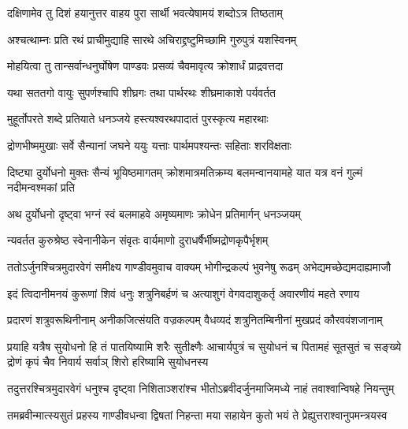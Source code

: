 \twolineshloka
{दक्षिणामेव तु दिशं हयानुत्तर वाहय}
{पुरा सार्थी भवत्येषामयं शब्दोऽत्र तिष्ठताम्}


\twolineshloka
{अश्चत्थाम्नः प्रति रथं प्राचीमुद्याहि सारथे}
{अचिराद्द्रष्टुमिच्छामि गुरुपुत्रं यशस्विनम्}



\twolineshloka
{मोहयित्वा तु तान्सर्वान्धनुर्घोषेण पाण्डवः}
{प्रसव्यं चैवमावृत्य क्रोशार्धं प्राद्रवत्तदा}


\twolineshloka
{यथा सततगो वायुः सुपर्णश्चापि शीघ्रगः}
{तथा पार्थरथः शीघ्रमाकाशे पर्यवर्तत}


\twolineshloka
{मुहूर्तोपरते शब्दे प्रतियाते धनञ्जये}
{हस्त्यश्वरथपादातं पुरस्कृत्य महारथाः}


\twolineshloka
{द्रोणभीष्ममुखाः सर्वे सैन्यानां जघने ययुः}
{यत्ताः पार्थमपश्यन्तः सहिताः शरविक्षताः}




\threelineshloka
{दिष्ट्या दुर्योधनो मुक्तः सैन्यं भूयिष्ठमागतम्}
{क्रोशमात्रमतिक्रम्य बलमन्वानयामहे}
{यात यत्र वनं गुल्मं नदीमन्वश्मकां प्रति}



\twolineshloka
{अथ दुर्योधनो दृष्ट्वा भग्नं स्वं बलमाहवे}
{अमृष्यमाणः क्रोधेन प्रतिमार्गन् धनञ्जयम्}


\twolineshloka
{न्यवर्तत कुरुश्रेष्ठ स्वेनानीकेन संवृतः}
{वार्यमाणो दुराधर्षैर्भीष्मद्रोणकृपैर्भृशम्}


\fourlineindentedshloka
{ततोऽर्जुनश्चित्रमुदारवेगं}
{समीक्ष्य गाण्डीवमुवाच वाक्यम्}
{भोगीन्द्रकल्पं भुवनेषु रूढम्}
{अभेद्यमच्छेद्यमदाह्यमाजौ}


\fourlineindentedshloka
{इदं त्विदानीमनयं कुरूणां}
{शिवं धनुः शत्रुनिबर्हणं च}
{अत्याशुगं वेगवदाशुकर्तृ}
{अवारणीयं महते रणाय}


\fourlineindentedshloka
{प्रदारणं शत्रुवरूथिनीनाम्}
{अनीकजित्संयति वज्रकल्पम्}
{वैधव्यदं शत्रुनितम्बिनीनां}
{मुखप्रदं कौरववंशजानाम्}


\sixlineindentedshloka
{प्रयाहि यत्रैष सुयोधनो हि}
{तं पातयिष्यामि शरैः सुतीक्ष्णैः}
{आचार्यपुत्रं च सुयोधनं च}
{पितामहं सूतसुतं च सङ्ख्ये}
{द्रोणं कृपं चैव निवार्य सर्वाञ्}
{शिरो हरिष्यामि सुयोधनस्य}



\fourlineindentedshloka
{तदुत्तरश्चित्रमुदारवेगं}
{धनुश्च दृष्ट्वा निशिताञ्शरांश्च}
{भीतोऽब्रवीदर्जुनमाजिमध्ये}
{नाहं तवाश्वान्विषहे नियन्तुम्}


\fourlineindentedshloka
{तमब्रवीन्मात्स्यसुतं प्रहस्य}
{गाण्डीवधन्वा द्विषतां निहन्ता}
{मया सहायेन कुतो भयं ते}
{प्रेह्युत्तराश्वानुपमन्त्रयस्व}


